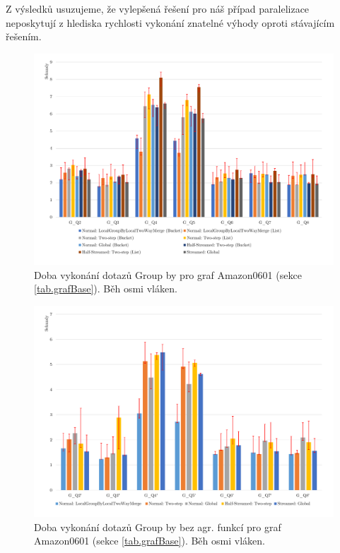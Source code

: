 \bigskip
Z výsledků usuzujeme, že vylepšená řešení pro náš případ paralelizace neposkytují z hlediska rychlosti vykonání znatelné výhody oproti stávajícím řešením.

\begin{figure}[!htp]
\includegraphics[width=\linewidth]{../img/amazonGroupByPar.pdf}\centering
\caption{Doba vykonání dotazů Group by pro graf Amazon0601 (sekce \ref{tab.grafBase}). Běh osmi vláken.}
\label{figure.amazonGroupByPar}
\end{figure}
\begin{figure}[!htp]
\includegraphics[width=\linewidth]{../img/amazonGroupByParNoAgg.pdf}\centering
\caption{Doba vykonání dotazů Group by bez agr. funkcí pro graf Amazon0601 (sekce \ref{tab.grafBase}). Běh osmi vláken.}
\label{figure.amazonGroupByParNoAgg}
\end{figure}


